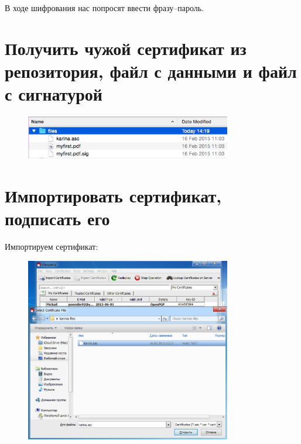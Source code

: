 \documentclass[utf8x, 12pt]{G7-32}
\begin{document}
В ходе шифрования нас попросят ввести фразу--пароль. 


\section{Получить чужой сертификат из репозитория, файл с данными и файл с сигнатурой}

\begin{figure}[hhh!]
	\begin{center}
		\includegraphics[width=9cm]{img/4_1}
	\end{center}
\end{figure}	

\newpage

\section{Импортировать сертификат, подписать его}

Импортируем сертификат:
\begin{figure}[hhh!]
	\begin{center}
		\includegraphics[width=9cm]{img/5_1}
	\end{center}
\end{figure}	
\end{document}
